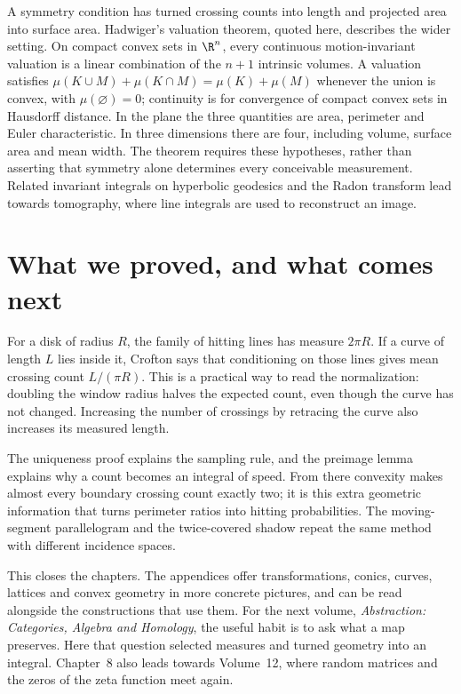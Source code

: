 \begin{beauty}
A symmetry condition has turned crossing counts into length and projected area into surface area. Hadwiger's valuation theorem, quoted here, describes the wider setting. On compact convex sets in $\R^n$, every continuous motion-invariant valuation is a linear combination of the $n+1$ intrinsic volumes. A valuation satisfies $\mu(K\cup M)+\mu(K\cap M)=\mu(K)+\mu(M)$ whenever the union is convex, with $\mu(\varnothing)=0$; continuity is for convergence of compact convex sets in Hausdorff distance. In the plane the three quantities are area, perimeter and Euler characteristic. In three dimensions there are four, including volume, surface area and mean width. The theorem requires these hypotheses, rather than asserting that symmetry alone determines every conceivable measurement. Related invariant integrals on hyperbolic geodesics and the Radon transform lead towards tomography, where line integrals are used to reconstruct an image.
\end{beauty}

\section{What we proved, and what comes next}

For a disk of radius $R$, the family of hitting lines has measure $2\pi R$. If a curve of length $L$ lies inside it, Crofton says that conditioning on those lines gives mean crossing count $L/(\pi R)$. This is a practical way to read the normalization: doubling the window radius halves the expected count, even though the curve has not changed. Increasing the number of crossings by retracing the curve also increases its measured length.

The uniqueness proof explains the sampling rule, and the preimage lemma explains why a count becomes an integral of speed. From there convexity makes almost every boundary crossing count exactly two; it is this extra geometric information that turns perimeter ratios into hitting probabilities. The moving-segment parallelogram and the twice-covered shadow repeat the same method with different incidence spaces.

This closes the chapters. The appendices offer transformations, conics, curves, lattices and convex geometry in more concrete pictures, and can be read alongside the constructions that use them. For the next volume, \emph{Abstraction: Categories, Algebra and Homology}, the useful habit is to ask what a map preserves. Here that question selected measures and turned geometry into an integral. Chapter~8 also leads towards Volume~12, where random matrices and the zeros of the zeta function meet again.

